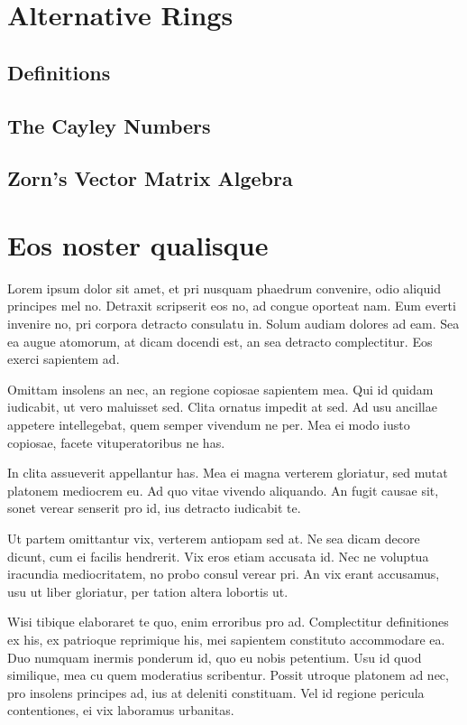 \chapter{Alternative Rings}
\label{altrings} %
\section{Definitions}
\label{defs}

\section{The Cayley Numbers}
\label{cayley}

\section{Zorn's Vector Matrix Algebra}
\label{zorn}

\chapter{Eos noster qualisque}
Lorem ipsum dolor sit amet, et pri nusquam phaedrum convenire, odio aliquid principes mel no. Detraxit scripserit eos no, ad congue oporteat nam. Eum everti invenire no, pri corpora detracto consulatu in. Solum audiam dolores ad eam. Sea ea augue atomorum, at dicam docendi est, an sea detracto complectitur. Eos exerci sapientem ad.

Omittam insolens an nec, an regione copiosae sapientem mea. Qui id quidam iudicabit, ut vero maluisset sed. Clita ornatus impedit at sed. Ad usu ancillae appetere intellegebat, quem semper vivendum ne per. Mea ei modo iusto copiosae, facete vituperatoribus ne has.

In clita assueverit appellantur has. Mea ei magna verterem gloriatur, sed mutat platonem mediocrem eu. Ad quo vitae vivendo aliquando. An fugit causae sit, sonet verear senserit pro id, ius detracto iudicabit te.

Ut partem omittantur vix, verterem antiopam sed at. Ne sea dicam decore dicunt, cum ei facilis hendrerit. Vix eros etiam accusata id. Nec ne voluptua iracundia mediocritatem, no probo consul verear pri. An vix erant accusamus, usu ut liber gloriatur, per tation altera lobortis ut.

Wisi tibique elaboraret te quo, enim erroribus pro ad. Complectitur definitiones ex his, ex patrioque reprimique his, mei sapientem constituto accommodare ea. Duo numquam inermis ponderum id, quo eu nobis petentium. Usu id quod similique, mea cu quem moderatius scribentur. Possit utroque platonem ad nec, pro insolens principes ad, ius at deleniti constituam. Vel id regione pericula contentiones, ei vix laboramus urbanitas.

